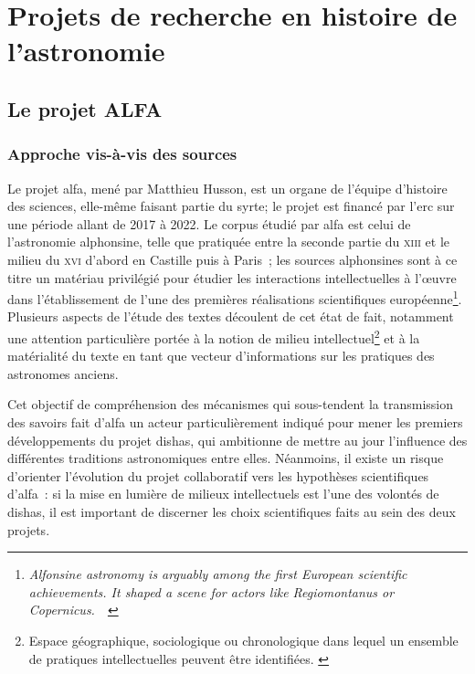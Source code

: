 \documentclass[a4paper,12pt,twoside]{book}
\newcommand{\eng}{\emph}
\newcommand{\XIII}{\textsc{xiii}\ieme{}\xspace}
\newcommand{\XVI}{\textsc{xvi}\ieme{}\xspace}
\newcommand{\g}[1]{\og#1~\fg}
\newcommand{\dishas}{\gls{dishas}\xspace}
\newcommand{\alfa}{\gls{alfa}\xspace}
\newcommand{\syrte}{\gls{syrte}\xspace}
\newcommand{\erc}{\gls{erc}\xspace}
\begin{document}
	\section{Projets de recherche en histoire de l'astronomie}
		\subsection{Le projet ALFA}
			\subsubsection{Approche vis-à-vis des sources}
Le projet \alfa, mené par Matthieu Husson, est un organe de l'équipe d'histoire des sciences, elle-même faisant partie du \syrte; le projet est financé par l'\erc sur une période allant de 2017 à 2022. Le corpus étudié par \alfa est celui de l'astronomie alphonsine, telle que pratiquée entre la seconde partie du \XIII et le milieu du \XVI d'abord en Castille puis à Paris~; les sources alphonsines sont à ce titre un matériau privilégié pour étudier les interactions intellectuelles à l'œuvre dans l'établissement de l'une des premières réalisations scientifiques européenne\footnote{\g{\eng{Alfonsine astronomy is arguably among the first European scientific achievements. It shaped a scene for actors like Regiomontanus or Copernicus.}}~\cite{ShapingEuropeanScientific}}. Plusieurs aspects de l'étude des textes découlent de cet état de fait, notamment une attention particulière portée à la notion de milieu intellectuel\footnote{Espace géographique, sociologique ou chronologique dans lequel un ensemble de pratiques intellectuelles peuvent être identifiées. \cite{ShapingEuropeanScientific}} et à la matérialité du texte en tant que vecteur d'informations sur les pratiques des astronomes anciens.


Cet objectif de compréhension des mécanismes qui sous-tendent la transmission des savoirs fait d'\alfa un acteur particulièrement indiqué pour mener les premiers développements du projet \dishas, qui ambitionne de mettre au jour l'influence des différentes traditions astronomiques entre elles. Néanmoins, il existe un risque d'orienter l'évolution du projet collaboratif vers les hypothèses scientifiques d'\alfa~: si la mise en lumière de milieux intellectuels est l'une des volontés de \dishas, il est important de discerner les choix scientifiques faits au sein des deux projets.
\end{document}
